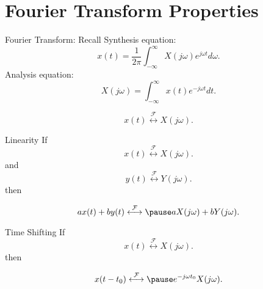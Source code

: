 \section{Fourier Transform Properties}


\begin{frame}{Fourier Transform: Recall}
Synthesis equation:
    \begin{equation}
        x(t) = \frac{1}{2\pi}\int_{-\infty}^{\infty}X(j\omega)e^{j\omega t} d\omega.
    \end{equation}
Analysis equation:
    \begin{equation}
        X(j\omega) = \int_{-\infty}^{\infty}x(t)e^{-j\omega t} dt.
    \end{equation}

    \begin{equation}
        x(t) \overset{\mathcal{F}}{\longleftrightarrow} X(j\omega).
    \end{equation}
\end{frame}


\begin{frame}{Linearity}
    If
    \begin{equation*}
        x(t) \overset{\mathcal{F}}{\longleftrightarrow} X(j\omega).
    \end{equation*}
    and
    \begin{equation*}
        y(t) \overset{\mathcal{F}}{\longleftrightarrow} Y(j\omega).
    \end{equation*}
    then

    {
    \begin{equation*}
        ax(t) + by(t) \overset{\mathcal{F}}{\longleftrightarrow} \pause aX(j\omega)+ bY(j\omega).
    \end{equation*}
    }
\end{frame}



\begin{frame}{Time Shifting}
    If
    \begin{equation*}
        x(t) \overset{\mathcal{F}}{\longleftrightarrow} X(j\omega).
    \end{equation*}
    then

    {
    \begin{equation*}
        x(t-t_0) \overset{\mathcal{F}}{\longleftrightarrow} \pause e^{-j\omega t_0}X(j\omega).
    \end{equation*}
    }
\end{frame}

